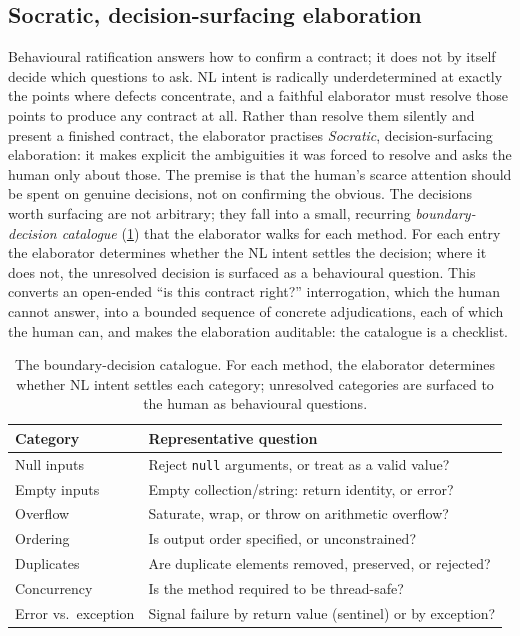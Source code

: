 \subsection{Socratic, decision-surfacing elaboration}\label{subsec:a5-socratic}

Behavioural ratification answers how to confirm a contract; it does not by itself decide which questions to ask. NL intent is radically underdetermined at exactly the points where defects concentrate, and a faithful elaborator must resolve those points to produce any contract at all. Rather than resolve them silently and present a finished contract, the elaborator practises \emph{Socratic}, decision-surfacing elaboration: it makes explicit the ambiguities it was forced to resolve and asks the human only about those. The premise is that the human's scarce attention should be spent on genuine decisions, not on confirming the obvious. The decisions worth surfacing are not arbitrary; they fall into a small, recurring \emph{boundary-decision catalogue} (\cref{tab:a5-boundary}) that the elaborator walks for each method. For each entry the elaborator determines whether the NL intent settles the decision; where it does not, the unresolved decision is surfaced as a behavioural question. This converts an open-ended ``is this contract right?'' interrogation, which the human cannot answer, into a bounded sequence of concrete adjudications, each of which the human can, and makes the elaboration auditable: the catalogue is a checklist.

\begin{table}[t]
\centering
\caption{The boundary-decision catalogue. For each method, the elaborator determines whether NL intent settles each category; unresolved categories are surfaced to the human as behavioural questions.}
\label{tab:a5-boundary}
\begin{tabular}{@{}ll@{}}
\toprule
Category & Representative question \\
\midrule
Null inputs        & Reject \texttt{null} arguments, or treat as a valid value? \\
Empty inputs       & Empty collection/string: return identity, or error? \\
Overflow           & Saturate, wrap, or throw on arithmetic overflow? \\
Ordering           & Is output order specified, or unconstrained? \\
Duplicates         & Are duplicate elements removed, preserved, or rejected? \\
Concurrency        & Is the method required to be thread-safe? \\
Error vs.\ exception & Signal failure by return value (sentinel) or by exception? \\
\bottomrule
\end{tabular}
\end{table}


